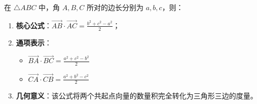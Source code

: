 \begin{statementbox}
在 $\triangle ABC$ 中，角 $A, B, C$ 所对的边长分别为 $a, b, c$，则：
\begin{enumerate}
    \item \textbf{核心公式}：$\vec{AB} \cdot \vec{AC} = \frac{b^2 + c^2 - a^2}{2}$；
    \item \textbf{通项表示}：
    \begin{itemize}
        \item $\vec{BA} \cdot \vec{BC} = \frac{a^2 + c^2 - b^2}{2}$
        \item $\vec{CA} \cdot \vec{CB} = \frac{a^2 + b^2 - c^2}{2}$
    \end{itemize}
    \item \textbf{几何意义}：该公式将两个共起点向量的数量积完全转化为三角形三边的度量。
\end{enumerate}
\end{statementbox}